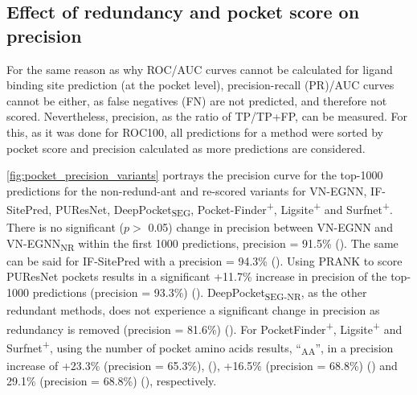 \subsection{Effect of redundancy and pocket score on precision}

For the same reason as why ROC/AUC curves cannot be calculated for ligand binding site prediction (at the pocket level), precision-recall (PR)/AUC curves cannot be either, as false negatives (FN) are not predicted, and therefore not scored. Nevertheless, precision, as the ratio of TP/TP+FP, can be measured. For this, as it was done for ROC100, all predictions for a method were sorted by pocket score and precision calculated as more predictions are considered.

\autoref{fig:pocket_precision_variants} portrays the precision curve for the top-1000 predictions for the non-redund-ant and re-scored variants for VN-EGNN, IF-SitePred, PUResNet, DeepPocket\textsubscript{SEG}, Pocket-Finder\textsuperscript{+}, Ligsite\textsuperscript{+} and Surfnet\textsuperscript{+}. There is no significant ($p >$ 0.05) change in precision between VN-EGNN and VN-EGNN\textsubscript{NR} within the first 1000 predictions, precision = 91.5\% (). The same can be said for IF-SitePred with a precision = 94.3\% (). Using PRANK to score PUResNet pockets results in a significant +11.7\% increase in precision of the top-1000 predictions (precision = 93.3\%) (). DeepPocket\textsubscript{SEG-NR}, as the other redundant methods, does not experience a significant change in precision as redundancy is removed (precision = 81.6\%) (). For PocketFinder\textsuperscript{+}, Ligsite\textsuperscript{+} and Surfnet\textsuperscript{+}, using the number of pocket amino acids results, ``\textsubscript{AA}'', in a precision increase of +23.3\% (precision = 65.3\%), (), +16.5\% (precision = 68.8\%) () and 29.1\% (precision = 68.8\%) (), respectively. 

